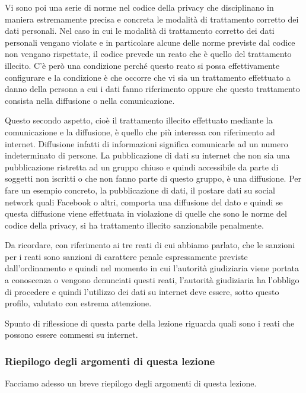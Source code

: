 Vi sono poi una serie di norme nel codice della privacy che disciplinano in maniera estremamente precisa e concreta le modalità di trattamento corretto dei dati personali. Nel caso in cui le modalità di trattamento corretto dei dati personali vengano violate e in particolare alcune delle norme previste dal codice non vengano rispettate, il codice prevede un reato che è quello del trattamento illecito. C'è però una condizione perché questo reato si possa effettivamente configurare e la condizione è che occorre che vi sia un trattamento effettuato a danno della persona a cui i dati fanno riferimento oppure che questo trattamento consista nella diffusione o nella comunicazione.

Questo secondo aspetto, cioè il trattamento illecito effettuato mediante la comunicazione e la diffusione, è quello che più interessa con riferimento ad internet. Diffusione infatti di informazioni significa comunicarle ad un numero indeterminato di persone. La pubblicazione di dati su internet che non sia una pubblicazione ristretta ad un gruppo chiuso e quindi accessibile da parte di soggetti non iscritti o che non fanno parte di questo gruppo, è una diffusione. Per fare un esempio concreto, la pubblicazione di dati, il postare dati su social network quali Facebook o altri, comporta una diffusione del dato e quindi se questa diffusione viene effettuata in violazione di quelle che sono le norme del codice della privacy, si ha trattamento illecito sanzionabile penalmente.

Da ricordare, con riferimento ai tre reati di cui abbiamo parlato, che le sanzioni per i reati sono sanzioni di carattere penale espressamente previste dall'ordinamento e quindi nel momento in cui l'autorità giudiziaria viene portata a conoscenza o vengono denunciati questi reati, l'autorità giudiziaria ha l'obbligo di procedere e quindi l'utilizzo dei dati su internet deve essere, sotto questo profilo, valutato con estrema attenzione. 

Spunto di riflessione di questa parte della lezione riguarda quali sono i reati che possono essere commessi su internet.

\subsubsection*{Riepilogo degli argomenti di questa lezione}
Facciamo adesso un breve riepilogo degli argomenti di questa lezione.

